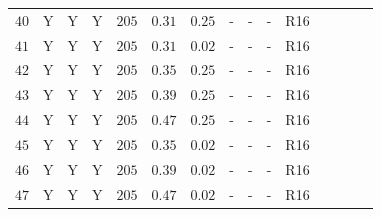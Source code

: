 \begin{table}[tbp]
{\begin{tabular}{lcccccccccccccr}
\rule[-1ex]{0pt}{2.5ex} $40$ & Y & Y & Y & $205$ & $0.31 $ & $0.25$ & - & - & - & R16 & \cite{Riess:2016jrr} & \cite{Pietrzynski:2013gia} & \cite{Riess:2016jrr} & \cite{Riess:2016jrr} \\ 
\rule[-1ex]{0pt}{2.5ex} $41$ & Y & Y & Y & $205$ & $0.31 $ & $0.02$ & - & - & - & R16 & \cite{Riess:2016jrr} & \cite{Pietrzynski:2013gia} & \cite{Riess:2016jrr} & \cite{Riess:2016jrr} \\
\rule[-1ex]{0pt}{2.5ex} $42$ & Y & Y & Y & $205$ & $0.35 $ & $0.25$ & - & - & - & R16 & \cite{Riess:2016jrr} & \cite{Pietrzynski:2013gia} & \cite{Riess:2016jrr} & \cite{Riess:2016jrr} \\
\rule[-1ex]{0pt}{2.5ex} $43$ & Y & Y & Y & $205$ & $0.39 $ & $0.25$ & - & - & - & R16 & \cite{Riess:2016jrr} & \cite{Pietrzynski:2013gia} & \cite{Riess:2016jrr} & \cite{Riess:2016jrr} \\
\rule[-1ex]{0pt}{2.5ex} $44$ & Y & Y & Y & $205$ & $0.47 $ & $0.25$ & - & - & - & R16 & \cite{Riess:2016jrr} & \cite{Pietrzynski:2013gia} & \cite{Riess:2016jrr} & \cite{Riess:2016jrr} \\
\rule[-1ex]{0pt}{2.5ex} $45$ & Y & Y & Y & $205$ & $0.35 $ & $0.02$ & - & - & - & R16 & \cite{Riess:2016jrr} & \cite{Pietrzynski:2013gia} & \cite{Riess:2016jrr} & \cite{Riess:2016jrr} \\
\rule[-1ex]{0pt}{2.5ex} $46$ & Y & Y & Y & $205$ & $0.39 $ & $0.02$ & - & - & - & R16 & \cite{Riess:2016jrr} & \cite{Pietrzynski:2013gia} & \cite{Riess:2016jrr} & \cite{Riess:2016jrr} \\
\rule[-1ex]{0pt}{2.5ex} $47$ & Y & Y & Y & $205$ & $0.47 $ & $0.02$ & - & - & - & R16 & \cite{Riess:2016jrr} & \cite{Pietrzynski:2013gia} & \cite{Riess:2016jrr} & \cite{Riess:2016jrr} \\


\end{tabular}}
\end{table}
